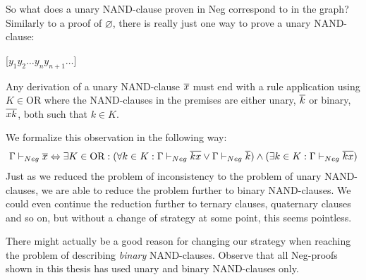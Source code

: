 So what does a unary NAND-clause proven in Neg correspond to in the graph?
Similarly to a proof of $\varnothing$, there is really just one way to prove a unary NAND-clause:
\begin{prooftree*}
  \Hypo{\dots}
  \Hypo{\dots}
  [$y_1y_2\dots y_ny_{n+1}\dots$]{}
\end{prooftree*}
Any derivation of a unary NAND-clause $\overline{x}$ must end with a rule application using $K \in \text{OR}$ where the NAND-clauses in the premises are either unary, $\overline{k}$ or binary, $\overline{xk}$, both such that $k \in K$.

We formalize this observation in the following way:
\begin{align}
  \Gamma \vdash_{Neg} \overline{x} \Leftrightarrow \exists K \in \text{OR}: (\forall k \in K: \Gamma \vdash_{Neg} \overline{kx} \vee \Gamma \vdash_{Neg} \overline{k}) \wedge (\exists k \in K: \Gamma \vdash_{Neg} \overline{kx})
\end{align}
Just as we reduced the problem of inconsistency to the problem of unary NAND-clauses, we are able to reduce the problem further to binary NAND-clauses.
We could even continue the reduction further to ternary clauses, quaternary clauses and so on, but without a change of strategy at some point, this seems pointless.

There might actually be a good reason for changing our strategy when reaching the problem of describing \textit{binary} NAND-clauses.
Observe that all Neg-proofs shown in this thesis has used unary and binary NAND-clauses only. 
